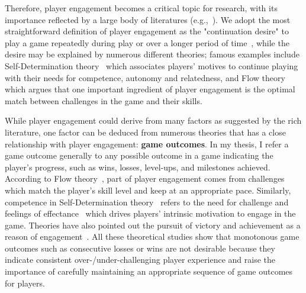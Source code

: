 Therefore, player engagement becomes a critical topic for research, with its importance reflected by a large body of literatures (e.g.,~\cite{boyle2012engagement,schoenau2011player,choi2004people,brockmyer2009development}). We adopt the most straightforward definition of player engagement as the "continuation desire" to play a game repeatedly during play or over a longer period of time~\cite{schoenau2011player}, while the desire may be explained by numerous different theories; famous examples include Self-Determination theory~\cite{przybylski2010motivational,ryan2006motivational} which associates players' motives to continue playing with their needs for competence, autonomy and relatedness, and Flow theory~\cite{sweetser2005gameflow,flow1990psychology,chen2007flow} which argues that one important ingredient of player engagement is the optimal match between challenges in the game and their skills.

While player engagement could derive from many factors as suggested by the rich literature, one factor can be deduced from numerous theories that has a close relationship with player engagement: \textbf{game outcomes}. In my thesis, I refer a game outcome generally to any possible outcome in a game indicating the player's progress, such as wins, losses, level-ups, and milestones achieved. According to Flow theory~\cite{sweetser2005gameflow,flow1990psychology,chen2007flow}, part of player engagement comes from challenges which match the player's skill level and keep at an appropriate pace. Similarly, competence in Self-Determination theory~\cite{przybylski2010motivational,ryan2006motivational} refers to the need for challenge and feelings of effectance~\cite{deci1985intrinsic,white1959motivation} which drives players' intrinsic motivation to engage in the game.  Theories have also pointed out the pursuit of victory and achievement as a reason of engagement~\cite{schoenau2011player,yee2006motivations,sherry2006video,wu2010falling,lazzaro2004we}. All these theoretical studies show that monotonous game outcomes such as consecutive losses or wins are not desirable because they indicate consistent over-/under-challenging player experience and raise the importance of carefully maintaining an appropriate sequence of game outcomes for players.

